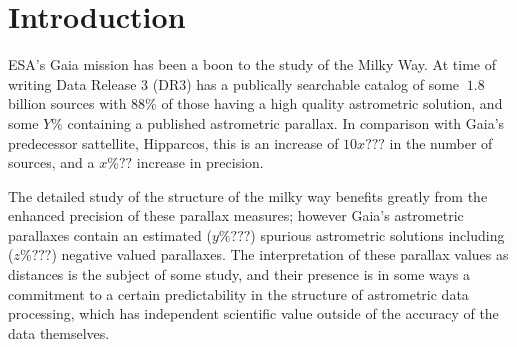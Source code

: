 \documentclass[twocolumn]{aastex631}
\begin{document}

\section{Introduction} \label{sec:intro}


ESA's Gaia mission has been a boon to the study of the Milky Way. At time of writing Data Release 3 (DR3) has a publically searchable catalog of some $~1.8$ billion sources with $88\%$ of those having a high quality astrometric solution, and some $Y\%$ containing a published astrometric parallax. In comparison with Gaia's predecessor sattellite, Hipparcos, this is an increase of $10x???$ in the number of sources, and a $x\%??$ increase in precision.

The detailed study of the structure of the milky way benefits greatly from the enhanced precision of these parallax measures; however Gaia's astrometric parallaxes contain an estimated ($y\%???$) spurious astrometric solutions including ($z\%???$) negative valued parallaxes. The interpretation of these parallax values as distances is the subject of some study, and their presence is in some ways a commitment to a certain predictability in the structure of astrometric data processing, which has independent scientific value outside of the accuracy of the data themselves.
\end{document}
